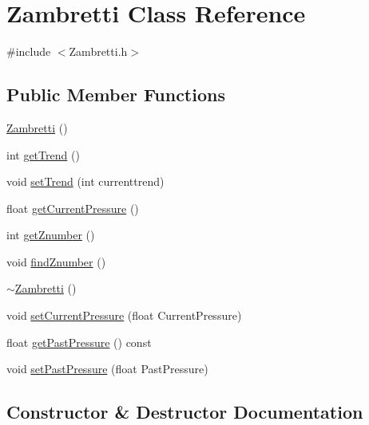 \hypertarget{class_zambretti}{}\section{Zambretti Class Reference}
\label{class_zambretti}


{\ttfamily \#include $<$Zambretti.\+h$>$}

\subsection*{Public Member Functions}
\begin{DoxyCompactItemize}
\item 
\hyperlink{class_zambretti_aa4948ec2096aefdbae2cebcdf8b80ee3}{Zambretti} ()
\item 
int \hyperlink{class_zambretti_ac46339c15cde0687b2008e4df0ecb4f9}{get\+Trend} ()
\item 
void \hyperlink{class_zambretti_a9237fb46dd347d7b0c5ecec1b9c4becc}{set\+Trend} (int currenttrend)
\item 
float \hyperlink{class_zambretti_ab7f8a79fbd772925a9e41c5789826385}{get\+Current\+Pressure} ()
\item 
int \hyperlink{class_zambretti_aac68758fdd41eb35c8ccd832e7b82e66}{get\+Znumber} ()
\item 
void \hyperlink{class_zambretti_a2722dff0af5aab457e344f9e4de0e6f2}{find\+Znumber} ()
\item 
\hyperlink{class_zambretti_a3066f3c5d93f8d08c34fc3a838e6b7f7}{$\sim$\+Zambretti} ()
\item 
void \hyperlink{class_zambretti_a9c0ea9c2f5d6b18f716b91c71088f208}{set\+Current\+Pressure} (float Current\+Pressure)
\item 
float \hyperlink{class_zambretti_a1c420aa581bae4f38859f110e6d2d876}{get\+Past\+Pressure} () const
\item 
void \hyperlink{class_zambretti_aaf38d93e2550c2c6f081f9d8f346e2fb}{set\+Past\+Pressure} (float Past\+Pressure)
\end{DoxyCompactItemize}


\subsection{Constructor \& Destructor Documentation}
\mbox{\label{class_zambretti_aa4948ec2096aefdbae2cebcdf8b80ee3}} 
